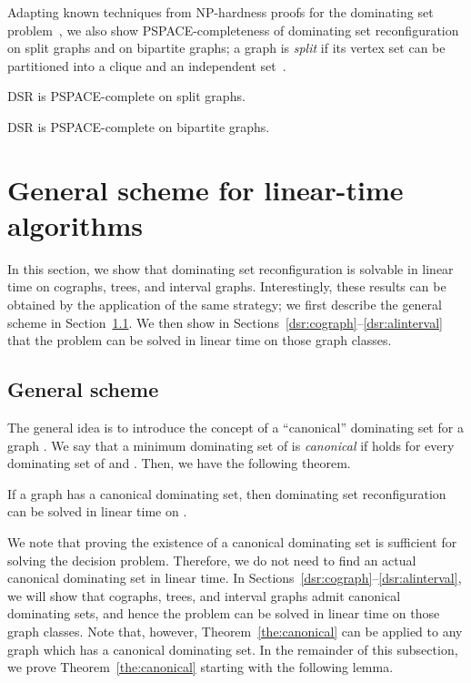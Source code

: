 \documentclass{llncs}
\begin{document}
Adapting known techniques from NP-hardness proofs for the {\sc dominating set} problem~\cite{Ber84}, 
we also show PSPACE-completeness of {\sc dominating set reconfiguration}
on split graphs and on bipartite graphs; a graph is {\em split} if its vertex set can be
partitioned into a clique and an independent set~\cite{BLS99}.

\begin{theorem}[*]\label{the:split}
{\sc DSR} is PSPACE-complete on split graphs.
\end{theorem}

\begin{theorem}[*]\label{the:bipartite}
{\sc DSR} is PSPACE-complete on bipartite graphs.
\end{theorem}

\section{General scheme for linear-time algorithms} \label{sec:algo}

In this section, we show that {\sc dominating set reconfiguration} is
solvable in linear time on cographs, trees, and interval graphs.
Interestingly, these results can be obtained by the application
of the same strategy; we first describe the general scheme in Section~\ref{dsr:genestra}.
We then show in Sections~\ref{dsr:cograph}--\ref{dsr:alinterval} that the
problem can be solved in linear time on those graph classes.

\subsection{General scheme}\label{dsr:genestra}
The general idea is to introduce the concept of a ``canonical'' dominating set for a graph .
We say that a minimum dominating set  of  is {\em canonical}
if  holds for every dominating set  of  and .
Then, we have the following theorem.

\begin{theorem} \label{the:canonical}
If a graph  has a canonical dominating set, then {\sc dominating set reconfiguration} can be solved in linear time on  .
\end{theorem}

We note that proving the existence of a canonical dominating set is sufficient for solving the decision problem.
Therefore, we do not need to find an actual canonical dominating set in linear time.
In Sections~\ref{dsr:cograph}--\ref{dsr:alinterval}, we will show that cographs, trees, and interval graphs admit
canonical dominating sets, and hence the problem can be solved in linear time on those graph classes.
Note that, however, Theorem~\ref{the:canonical} can be applied to any graph which has a canonical dominating set.
In the remainder of this subsection, we prove Theorem~\ref{the:canonical} starting 
with the following lemma.	
\end{document}
